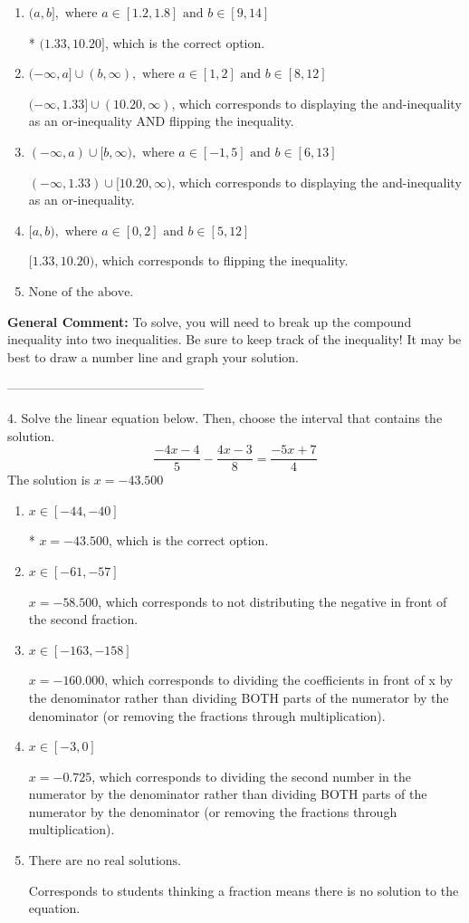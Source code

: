 \documentclass{extbook}[14pt]
\begin{document}
\begin{enumerate}[label=\Alph*.] 
\item $ (a, b], \text{ where } a \in [1.2, 1.8] \text{ and } b \in [9, 14] $ 

 * $(1.33, 10.20]$, which is the correct option. 
\item $ (-\infty, a] \cup (b, \infty), \text{ where } a \in [1, 2] \text{ and } b \in [8, 12] $ 

 $(-\infty, 1.33] \cup (10.20, \infty)$, which corresponds to displaying the and-inequality as an or-inequality AND flipping the inequality. 
\item $ (-\infty, a) \cup [b, \infty), \text{ where } a \in [-1, 5] \text{ and } b \in [6, 13] $ 

 $(-\infty, 1.33) \cup [10.20, \infty)$, which corresponds to displaying the and-inequality as an or-inequality. 
\item $ [a, b), \text{ where } a \in [0, 2] \text{ and } b \in [5, 12] $ 

 $[1.33, 10.20)$, which corresponds to flipping the inequality. 
\item $ \text{None of the above.} $ 

  
\end{enumerate} 
 
\textbf{General Comment:} To solve, you will need to break up the compound inequality into two inequalities. Be sure to keep track of the inequality! It may be best to draw a number line and graph your solution. 

-----------------------------------------------

4. Solve the linear equation below. Then, choose the interval that contains the solution.
\[ \frac{-4x -4}{5} - \frac{4x -3}{8} = \frac{-5x + 7}{4} \] 
The solution is $ x = -43.500 $ 

\begin{enumerate}[label=\Alph*.] 
\item $ x \in [-44, -40] $ 

 * $x = -43.500$, which is the correct option. 
\item $ x \in [-61, -57] $ 

  $x = -58.500$, which corresponds to not distributing the negative in front of the second fraction. 
\item $ x \in [-163, -158] $ 

  $x = -160.000$, which corresponds to dividing the coefficients in front of x by the denominator rather than dividing BOTH parts of the numerator by the denominator (or removing the fractions through multiplication). 
\item $ x \in [-3, 0] $ 

  $x = -0.725$, which corresponds to dividing the second number in the numerator by the denominator rather than dividing BOTH parts of the numerator by the denominator (or removing the fractions through multiplication). 
\item $ \text{There are no real solutions.} $ 

 Corresponds to students thinking a fraction means there is no solution to the equation. 
\end{enumerate} 
 
\end{document}
